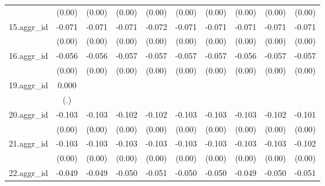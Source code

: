 {\begin{tabular}{l*{9}{c}}
          &   (0.00)         &   (0.00)         &   (0.00)         &   (0.00)         &   (0.00)         &   (0.00)         &   (0.00)         &   (0.00)         &   (0.00)         \\
[1em]
15.aggr\_id&   -0.071\sym{***}&   -0.071\sym{***}&   -0.071\sym{***}&   -0.072\sym{***}&   -0.071\sym{***}&   -0.071\sym{***}&   -0.071\sym{***}&   -0.071\sym{***}&   -0.071\sym{***}\\
          &   (0.00)         &   (0.00)         &   (0.00)         &   (0.00)         &   (0.00)         &   (0.00)         &   (0.00)         &   (0.00)         &   (0.00)         \\
[1em]
16.aggr\_id&   -0.056\sym{***}&   -0.056\sym{***}&   -0.057\sym{***}&   -0.057\sym{***}&   -0.057\sym{***}&   -0.057\sym{***}&   -0.056\sym{***}&   -0.057\sym{***}&   -0.057\sym{***}\\
          &   (0.00)         &   (0.00)         &   (0.00)         &   (0.00)         &   (0.00)         &   (0.00)         &   (0.00)         &   (0.00)         &   (0.00)         \\
[1em]
19.aggr\_id&    0.000         &                  &                  &                  &                  &                  &                  &                  &                  \\
          &      (.)         &                  &                  &                  &                  &                  &                  &                  &                  \\
[1em]
20.aggr\_id&   -0.103\sym{***}&   -0.103\sym{***}&   -0.102\sym{***}&   -0.102\sym{***}&   -0.103\sym{***}&   -0.103\sym{***}&   -0.103\sym{***}&   -0.102\sym{***}&   -0.101\sym{***}\\
          &   (0.00)         &   (0.00)         &   (0.00)         &   (0.00)         &   (0.00)         &   (0.00)         &   (0.00)         &   (0.00)         &   (0.00)         \\
[1em]
21.aggr\_id&   -0.103\sym{***}&   -0.103\sym{***}&   -0.103\sym{***}&   -0.103\sym{***}&   -0.103\sym{***}&   -0.103\sym{***}&   -0.103\sym{***}&   -0.103\sym{***}&   -0.102\sym{***}\\
          &   (0.00)         &   (0.00)         &   (0.00)         &   (0.00)         &   (0.00)         &   (0.00)         &   (0.00)         &   (0.00)         &   (0.00)         \\
[1em]
22.aggr\_id&   -0.049\sym{***}&   -0.049\sym{***}&   -0.050\sym{***}&   -0.051\sym{***}&   -0.050\sym{***}&   -0.050\sym{***}&   -0.049\sym{***}&   -0.050\sym{***}&   -0.051\sym{***}\\

\end{tabular}}
